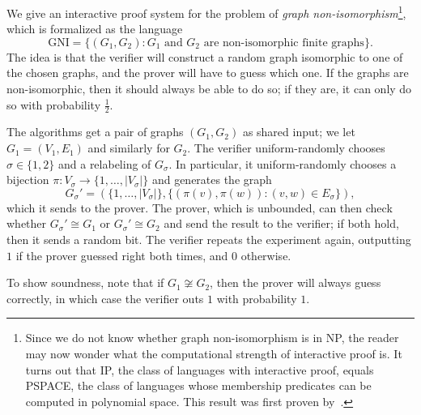 \begin{ex}\label{ex:graph-non-iso}
  We give an interactive proof system for the problem of \emph{graph
  non-isomorphism}\footnote{
    Since we do not know whether graph non-isomorphism is in NP, the reader may
    now wonder what the computational strength of interactive proof is. It turns
    out that IP, the class of languages with interactive proof, equals PSPACE,
    the class of languages whose membership predicates can be computed in
    polynomial space. This result was first proven by~\cite{shamir-1992}.
  }, which is formalized as the language \[
    \text{GNI} = \{(G_1,G_2): G_1\text{ and }G_2\text{ are non-isomorphic finite graphs}\}.
  \]
  The idea is that the verifier will construct a random graph isomorphic to one
  of the chosen graphs, and the prover will have to guess which one. If the
  graphs are non-isomorphic, then it should always be able to do so; if they
  are, it can only do so with probability $\frac{1}{2}$.

  The algorithms get a pair of graphs $(G_1,G_2)$ as shared input; we let $G_1 =
  (V_1,E_1)$ and similarly for $G_2$. The verifier uniform-randomly chooses $\sigma\in\{1,2\}$
  and a relabeling of $G_\sigma$. In particular, it uniform-randomly chooses a
  bijection $\pi: V_\sigma\to \{1,\dots,|V_\sigma|\}$ and generates the graph \[
    G_\sigma' = (\{1,\dots,|V_\sigma|\}, \{(\pi(v),\pi(w)): (v,w)\in E_\sigma\}),
  \]
  which it sends to the prover. The prover, which is unbounded, can then check
  whether $G_\sigma'\cong G_1$ or $G_\sigma'\cong G_2$ and send the result to
  the verifier; if both hold, then it sends a random bit. The verifier repeats
  the experiment again, outputting $1$ if the prover guessed right both times,
  and $0$ otherwise.

  To show soundness, note that if $G_1\not\cong G_2$, then the prover will always
  guess correctly, in which case the verifier outs $1$ with probability $1$.


\end{ex}
